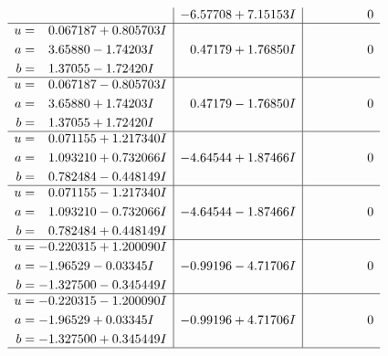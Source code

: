 \documentclass[1p]{elsarticle_modified}
\theoremstyle{definition}
\begin{document}
$$\begin{array}{c|c|c}
 & -6.57708 + 7.15153 I & \phantom{-0.000000 } 0 \\ \hline\begin{aligned}
u &= \phantom{-}0.067187 + 0.805703 I \\
a &= \phantom{-}3.65880 - 1.74203 I \\
b &= \phantom{-}1.37055 - 1.72420 I\end{aligned}
 & \phantom{-}0.47179 + 1.76850 I & \phantom{-0.000000 } 0 \\ \hline\begin{aligned}
u &= \phantom{-}0.067187 - 0.805703 I \\
a &= \phantom{-}3.65880 + 1.74203 I \\
b &= \phantom{-}1.37055 + 1.72420 I\end{aligned}
 & \phantom{-}0.47179 - 1.76850 I & \phantom{-0.000000 } 0 \\ \hline\begin{aligned}
u &= \phantom{-}0.071155 + 1.217340 I \\
a &= \phantom{-}1.093210 + 0.732066 I \\
b &= \phantom{-}0.782484 - 0.448149 I\end{aligned}
 & -4.64544 + 1.87466 I & \phantom{-0.000000 } 0 \\ \hline\begin{aligned}
u &= \phantom{-}0.071155 - 1.217340 I \\
a &= \phantom{-}1.093210 - 0.732066 I \\
b &= \phantom{-}0.782484 + 0.448149 I\end{aligned}
 & -4.64544 - 1.87466 I & \phantom{-0.000000 } 0 \\ \hline\begin{aligned}
u &= -0.220315 + 1.200090 I \\
a &= -1.96529 - 0.03345 I \\
b &= -1.327500 - 0.345449 I\end{aligned}
 & -0.99196 - 4.71706 I & \phantom{-0.000000 } 0 \\ \hline\begin{aligned}
u &= -0.220315 - 1.200090 I \\
a &= -1.96529 + 0.03345 I \\
b &= -1.327500 + 0.345449 I\end{aligned}
 & -0.99196 + 4.71706 I & \phantom{-0.000000 } 0\\
 \hline 
 \end{array}$$\newpage$$\begin{array}{c|c|c}  

\end{array}$$
\end{document}
